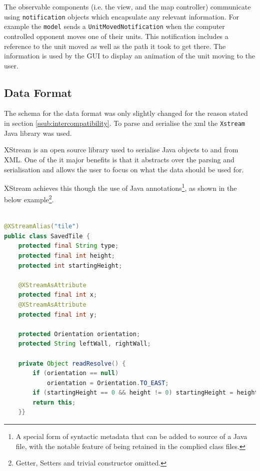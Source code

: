 

The observable components (i.e. the view, and the map controller) communicate using \texttt{notification} objects which encapsulate any relevant information. For example the \texttt{model} sends a \texttt{UnitMovedNotification} when the computer controlled opponent moves one of their units. This notification includes a reference to the unit moved as well as the path it took to get there. The information is used by the GUI to display an animation of the unit moving to the user.

\clearpage
\subsection{Data Format}
The schema for the data format was only slightly changed for the reason stated in section \ref{ssub:intercompatibility}. To parse and serialise the xml the \texttt{Xstream} Java library was used.
 
XStream is an open source library used to serialise Java objects to and from XML. One of the it major benefits is that it abstracts over the parsing and serialisation and allows the user to focus on what the data should be used for. 

XStream achieves this though the use of Java annotations\footnote{A special form of syntactic metadata that can be added to source of a Java file, with the notable feature of being retained in the complied class files.}, as shown in the below example\footnote{Getter, Setters and trivial constructor omitted.}.

\begin{lstlisting}[caption=Example of class that is serialisable with XStream, label=lst:SavedTile, language=java] %Java
	
@XStreamAlias("tile")
public class SavedTile {
	protected final String type;
	protected final int height; 
	protected int startingHeight;
	
	@XStreamAsAttribute
	protected final int x;
	@XStreamAsAttribute
	protected final int y;

	protected Orientation orientation;
	protected String leftWall, rightWall;
	
	private Object readResolve() {
		if (orientation == null)  
			orientation = Orientation.TO_EAST;
		if (startingHeight == 0 && height != 0) startingHeight = height;
		return this;
	}}
\end{lstlisting}

